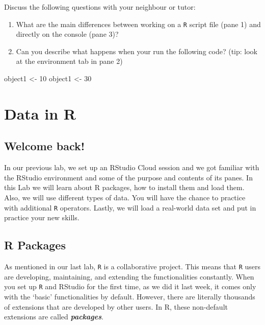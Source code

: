 \documentclass[
]{book}
\newenvironment{Shaded}{\begin{snugshade}}{\end{snugshade}}
\newcommand{\DecValTok}[1]{\textcolor[rgb]{0.00,0.00,0.81}{#1}}
\newcommand{\NormalTok}[1]{#1}
\newcommand{\OtherTok}[1]{\textcolor[rgb]{0.56,0.35,0.01}{#1}}
\providecommand{\tightlist}{%
  \setlength{\itemsep}{0pt}\setlength{\parskip}{0pt}}
\begin{document}
Discuss the following questions with your neighbour or tutor:

\begin{enumerate}
\def\labelenumi{\arabic{enumi}.}
\tightlist
\item
  What are the main differences between working on a \texttt{R} script file (pane 1) and directly on the console (pane 3)?
\item
  Can you describe what happens when your run the following code? (tip: look at the environment tab in pane 2)
\end{enumerate}

\begin{Shaded}
\begin{Highlighting}[]
\NormalTok{object1 }\OtherTok{\textless{}{-}} \DecValTok{10}
\NormalTok{object1 }\OtherTok{\textless{}{-}} \DecValTok{30}
\end{Highlighting}
\end{Shaded}

\hypertarget{lab2}{%
\chapter{Data in R}\label{lab2}}

\hypertarget{welcome-back}{%
\section{Welcome back!}\label{welcome-back}}

In our previous lab, we set up an RStudio Cloud session and we got familiar with the RStudio environment and some of the purpose and contents of its panes. In this Lab we will learn about R packages, how to install them and load them. Also, we will use different types of data. You will have the chance to practice with additional \texttt{R} operators. Lastly, we will load a real-world data set and put in practice your new skills.

\hypertarget{learn-packages}{%
\section{R Packages}\label{learn-packages}}

As mentioned in our last lab, \texttt{R} \citep{R-base} is a collaborative project. This means that \texttt{R} users are developing, maintaining, and extending the functionalities constantly. When you set up \texttt{R} and RStudio for the first time, as we did it last week, it comes only with the `basic' functionalities by default. However, there are literally thousands of extensions that are developed by other users. In R, these non-default extensions are called \emph{\textbf{packages}}.
\end{document}
